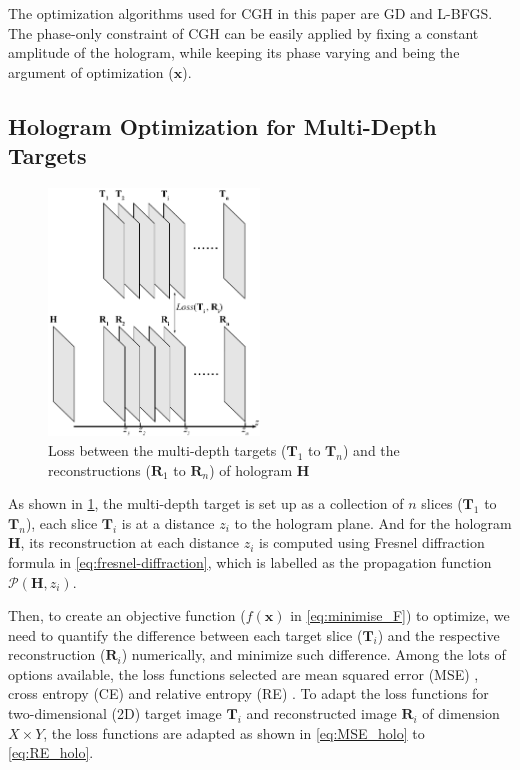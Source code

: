 The optimization algorithms used for CGH in this paper are GD and L-BFGS. The phase-only constraint of CGH can be easily applied by fixing a constant amplitude of the hologram, while keeping its phase varying and being the argument of optimization ($\textbf{x}$).




\subsection{Hologram Optimization for Multi-Depth Targets}

\begin{figure}[h!]
	\centering
	\includegraphics[width=0.5\textwidth]{Fresnel_slice_illustration}
	\caption{Loss between the multi-depth targets ($\textbf{T}_1$ to $\textbf{T}_n$) and the reconstructions ($\textbf{R}_1$ to $\textbf{R}_n$) of hologram $\textbf{H}$}
	\label{fig:Fresnel_slice_illustration}
\end{figure}

As shown in \cref{fig:Fresnel_slice_illustration}, the multi-depth target is set up as a collection of $n$ slices ($\textbf{T}_1$ to $\textbf{T}_n$), each slice $\textbf{T}_i$ is at a distance $z_i$ to the hologram plane. And for the hologram $\textbf{H}$, its reconstruction at each distance $z_i$ is computed using Fresnel diffraction formula in \cref{eq:fresnel-diffraction}, which is labelled as the propagation function $\mathcal{P}(\textbf{H}, z_i)$.

Then, to create an objective function ($f(\textbf{x})$ in \cref{eq:minimise_F}) to optimize, we need to quantify the difference between each target slice ($\textbf{T}_i$) and the respective reconstruction ($\textbf{R}_i$) numerically, and minimize such difference. Among the lots of options available, the loss functions selected are mean squared error (MSE) \cite{MSE_REF}, cross entropy (CE) \cite{cybenko1998mathematics} and relative entropy (RE) \cite{Kullback1951}. To adapt the loss functions for two-dimensional (2D) target image $\textbf{T}_i$ and reconstructed image $\textbf{R}_i$ of dimension $X\times Y$, the loss functions are adapted as shown in \cref{eq:MSE_holo} to \cref{eq:RE_holo}.

